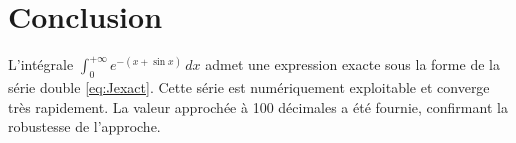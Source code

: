 \documentclass[a4paper,12pt]{article}
\begin{document}
\section{Conclusion}
L'intégrale \(\displaystyle \int_{0}^{+\infty} e^{-(x+\sin x)}\,dx\) admet une expression exacte sous la forme de la série double \eqref{eq:Jexact}. Cette série est numériquement exploitable et converge très rapidement. La valeur approchée à 100 décimales a été fournie, confirmant la robustesse de l'approche.
\end{document}
